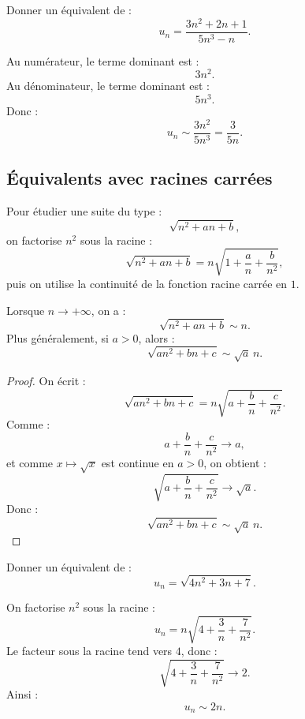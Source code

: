 \documentclass[11pt,a4paper]{article}
\begin{document}
\begin{exercicebox}
Donner un équivalent de :
\[
u_n=\frac{3n^2+2n+1}{5n^3-n}.
\]
\end{exercicebox}

\begin{correctionbox}
Au numérateur, le terme dominant est :
\[
3n^2.
\]
Au dénominateur, le terme dominant est :
\[
5n^3.
\]
Donc :
\[
u_n\sim \frac{3n^2}{5n^3}
=
\frac{3}{5n}.
\]
\end{correctionbox}

\subsection{Équivalents avec racines carrées}

\begin{methodbox}
Pour étudier une suite du type :
\[
\sqrt{n^2+an+b},
\]
on factorise \(n^2\) sous la racine :
\[
\sqrt{n^2+an+b}
=
 n\sqrt{1+\frac{a}{n}+\frac{b}{n^2}},
\]
puis on utilise la continuité de la fonction racine carrée en \(1\).
\end{methodbox}

\begin{theorembox}
Lorsque \(n\to+\infty\), on a :
\[
\sqrt{n^2+an+b}\sim n.
\]
Plus généralement, si \(a>0\), alors :
\[
\sqrt{a n^2+bn+c}\sim \sqrt a\,n.
\]
\end{theorembox}

\begin{proof}
On écrit :
\[
\sqrt{a n^2+bn+c}
=
n\sqrt{a+\frac bn+\frac c{n^2}}.
\]
Comme :
\[
a+\frac bn+\frac c{n^2}\to a,
\]
et comme \(x\mapsto\sqrt{x}\) est continue en \(a>0\), on obtient :
\[
\sqrt{a+\frac bn+\frac c{n^2}}\to\sqrt a.
\]
Donc :
\[
\sqrt{a n^2+bn+c}\sim \sqrt a\,n.
\]
\end{proof}

\begin{exercicebox}
Donner un équivalent de :
\[
u_n=\sqrt{4n^2+3n+7}.
\]
\end{exercicebox}

\begin{correctionbox}
On factorise \(n^2\) sous la racine :
\[
u_n=n\sqrt{4+\frac3n+\frac7{n^2}}.
\]
Le facteur sous la racine tend vers \(4\), donc :
\[
\sqrt{4+\frac3n+\frac7{n^2}}\to2.
\]
Ainsi :
\[
u_n\sim2n.
\]
\end{correctionbox}
\end{document}
